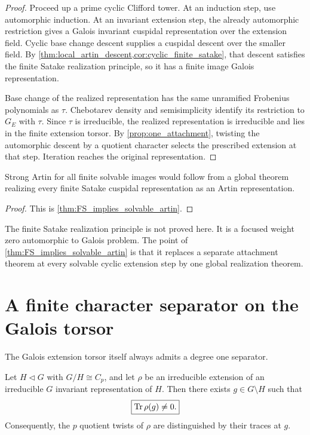 \begin{proof}
Proceed up a prime cyclic Clifford tower. At an induction step, use automorphic induction. At an invariant extension step, the already automorphic restriction gives a Galois invariant cuspidal representation over the extension field. Cyclic base change descent supplies a cuspidal descent over the smaller field. By \cref{thm:local_artin_descent,cor:cyclic_finite_satake}, that descent satisfies the finite Satake realization principle, so it has a finite image Galois representation.

Base change of the realized representation has the same unramified Frobenius polynomials as \(\tau\). Chebotarev density and semisimplicity identify its restriction to \(G_E\) with \(\tau\). Since \(\tau\) is irreducible, the realized representation is irreducible and lies in the finite extension torsor. By \cref{prop:one_attachment}, twisting the automorphic descent by a quotient character selects the prescribed extension at that step. Iteration reaches the original representation.
\end{proof}

\begin{corollary}\label{cor:single_target}
Strong Artin for all finite solvable images would follow from a global theorem realizing every finite Satake cuspidal representation as an Artin representation.
\end{corollary}

\begin{proof}
This is \cref{thm:FS_implies_solvable_artin}.
\end{proof}

\begin{remark}\label{rem:FS_scope}
The finite Satake realization principle is not proved here. It is a focused weight zero automorphic to Galois problem. The point of \cref{thm:FS_implies_solvable_artin} is that it replaces a separate attachment theorem at every solvable cyclic extension step by one global realization theorem.
\end{remark}

\section{A finite character separator on the Galois torsor}\label{sec:galois_separator}

The Galois extension torsor itself always admits a degree one separator.

\begin{theorem}\label{thm:galois_trace_separator}
Let \(H\triangleleft G\) with \(G/H\cong C_p\), and let \(\rho\) be an irreducible extension of an irreducible \(G\) invariant representation of \(H\). Then there exists \(g\in G\setminus H\) such that
\[
 \boxed{
 \operatorname{Tr}\rho(g)\neq0.
 }
\]
Consequently, the \(p\) quotient twists of \(\rho\) are distinguished by their traces at \(g\).
\end{theorem}

